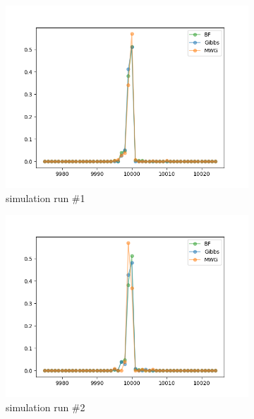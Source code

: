 \begin{figure}[H]
    \centering
    \begin{subfigure}{.3\textwidth}
    	\centering
        \includegraphics[width=\linewidth]{../../plots/Posterior_post_burnin_M2_N20000_NMCMC3_seed0_diffind2.png}
        \caption{simulation run \#1}
    \end{subfigure}
    \begin{subfigure}{.3\textwidth}
        \centering
    	\includegraphics[width=\linewidth]{../../plots/Posterior_post_burnin_M2_N20000_NMCMC3_seed1_diffind2.png}
    	\caption{simulation run \#2}
	\end{subfigure}
	\begin{subfigure}{.3\textwidth}

\end{subfigure}
\end{figure}
